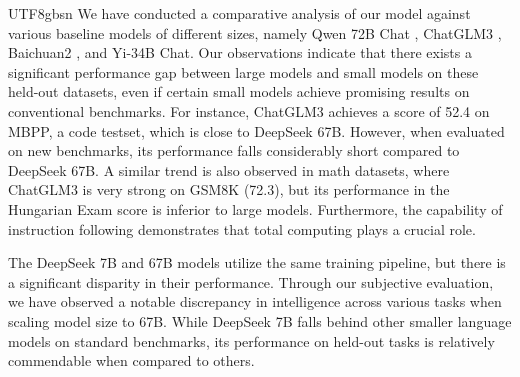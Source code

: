 \documentclass[11pt, a4paper, logo, copyright, nonumbering]{deepseek}
\begin{document}
\begin{CJK*}{UTF8}{gbsn}
We have conducted a comparative analysis of our model against various baseline models of different sizes, namely Qwen 72B Chat \citep{qwen}, ChatGLM3 \citep{glm}, Baichuan2 \citep{baichuan2}, and Yi-34B Chat. Our observations indicate that there exists a significant performance gap between large models and small models on these held-out datasets, even if certain small models achieve promising results on conventional benchmarks. For instance, ChatGLM3 achieves a score of 52.4 on MBPP, a code testset, which is close to DeepSeek 67B. However, when evaluated on new benchmarks, its performance falls considerably short compared to  DeepSeek 67B. A similar trend is also observed in math datasets, where ChatGLM3 is very strong on GSM8K (72.3), but its performance in the Hungarian Exam score is inferior to large models. Furthermore, the capability of instruction following demonstrates that total computing plays a crucial role. 

The DeepSeek 7B and 67B models utilize the same training pipeline, but there is a significant disparity in their performance. Through our subjective evaluation, we have observed a notable discrepancy in intelligence across various tasks when scaling model size to 67B. While DeepSeek 7B falls behind other smaller language models on standard benchmarks, its performance on held-out tasks is relatively commendable when compared to others.


\end{CJK*}
\end{document}
